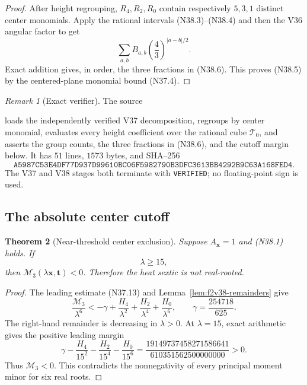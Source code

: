 \documentclass[11pt]{article}
\newtheorem{theorem}{Theorem}[section]
\theoremstyle{definition}
\theoremstyle{remark}
\newtheorem{remark}[theorem]{Remark}
\begin{document}
\begin{proof}
After height regrouping, \(R_4,R_2,R_0\) contain respectively
\(5,3,1\) distinct center monomials.  Apply the rational intervals
\textup{(N38.3)}--\textup{(N38.4)} and then the V36 angular factor to get
\[
 \sum_{a,b}B_{a,b}
 \left(\frac43\right)^{|a-b|/2}.
\tag{N38.7}
\]
Exact addition gives, in order, the three fractions in
\textup{(N38.6)}.  This proves \textup{(N38.5)} by the centered-plane
monomial bound \textup{(N37.4)}.
\end{proof}

\begin{remark}[Exact verifier]
\label{rem:f2v38-verifier}
The source
\begin{center}
\end{center}
loads the independently verified V37 decomposition, regroups by center
monomial, evaluates every height coefficient over the rational cube
\(\mathcal T_0\), and asserts the group counts, the three fractions in
\textup{(N38.6)}, and the cutoff margin below.  It has \(51\) lines,
\(1573\) bytes, and SHA--256
\[
\texttt{A5987C53E4DF77D937D99610BC06F5982790B3DFC3613BB4292B9C63A168FED4}.
\tag{N38.8}
\]
The V37 and V38 stages both terminate with \texttt{VERIFIED}; no
floating-point sign is used.
\end{remark}

\subsection{The absolute center cutoff}

\begin{theorem}[Near-threshold center exclusion]
\label{thm:f2v38-center-cutoff}
Suppose \(A_{\bm x}=1\) and \textup{(N38.1)} holds.  If
\[
 \lambda\geq15,
\tag{N38.9}
\]
then \(\mathcal M_3(\lambda\bm x,\bm t)<0\).  Therefore the heat sextic
is not real-rooted.
\end{theorem}

\begin{proof}
The leading estimate \textup{(N37.13)} and
Lemma~\ref{lem:f2v38-remainders} give
\[
 \frac{\mathcal M_3}{\lambda^6}
 <-\gamma+\frac{H_4}{\lambda^2}
            +\frac{H_2}{\lambda^4}
            +\frac{H_0}{\lambda^6},
 \qquad \gamma=\frac{254718}{625}.
\tag{N38.10}
\]
The right-hand remainder is decreasing in \(\lambda>0\).  At
\(\lambda=15\), exact arithmetic gives the positive leading margin
\[
 \gamma-\frac{H_4}{15^2}-\frac{H_2}{15^4}-\frac{H_0}{15^6}
 =\frac{19149737458271586641}{610351562500000000}>0.
\tag{N38.11}
\]
Thus \(\mathcal M_3<0\).  This contradicts the nonnegativity of every
principal moment minor for six real roots.
\end{proof}
\end{document}
